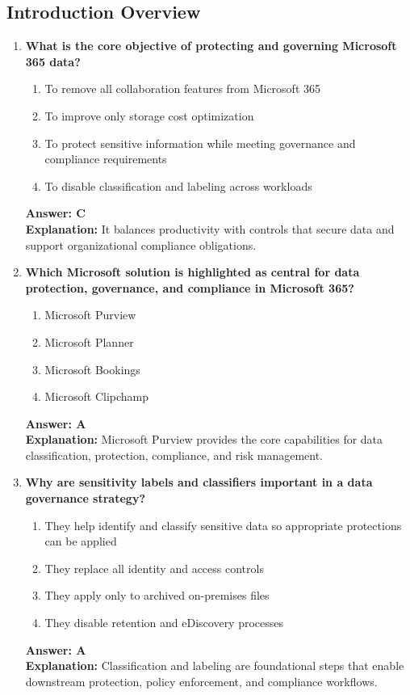 \documentclass[10pt]{article}
\begin{document}
\subsection{Introduction Overview}
\begin{enumerate}[leftmargin=*]

\item \textbf{What is the core objective of protecting and governing Microsoft 365 data?}
\begin{enumerate}[label=\Alph*.]
  \item To remove all collaboration features from Microsoft 365
  \item To improve only storage cost optimization
  \item To protect sensitive information while meeting governance and compliance requirements
  \item To disable classification and labeling across workloads
\end{enumerate}
\textbf{Answer: C}\\
\textbf{Explanation:} It balances productivity with controls that secure data and support organizational compliance obligations.

\item \textbf{Which Microsoft solution is highlighted as central for data protection, governance, and compliance in Microsoft 365?}
\begin{enumerate}[label=\Alph*.]
  \item Microsoft Purview
  \item Microsoft Planner
  \item Microsoft Bookings
  \item Microsoft Clipchamp
\end{enumerate}
\textbf{Answer: A}\\
\textbf{Explanation:} Microsoft Purview provides the core capabilities for data classification, protection, compliance, and risk management.

\item \textbf{Why are sensitivity labels and classifiers important in a data governance strategy?}
\begin{enumerate}[label=\Alph*.]
  \item They help identify and classify sensitive data so appropriate protections can be applied
  \item They replace all identity and access controls
  \item They apply only to archived on-premises files
  \item They disable retention and eDiscovery processes
\end{enumerate}
\textbf{Answer: A}\\
\textbf{Explanation:} Classification and labeling are foundational steps that enable downstream protection, policy enforcement, and compliance workflows.


\end{enumerate}
\end{document}
